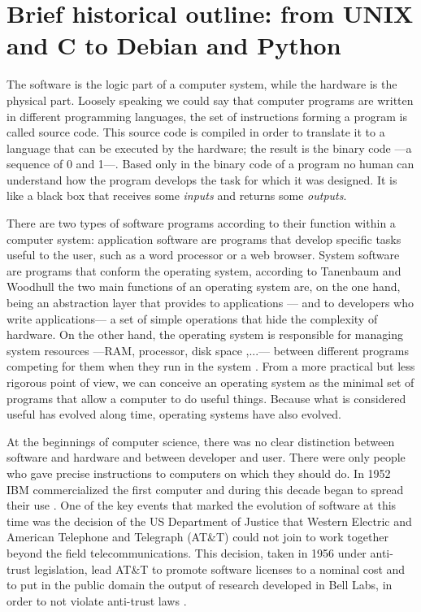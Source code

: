 \chapter{Brief historical outline: from UNIX and C to Debian and Python}
\label{historical_outline}

The software is the logic part of a computer system, while the hardware is the physical part. Loosely speaking we could say that computer programs are written in different programming languages, the set of instructions forming a program is called source code. This source code is compiled in order to translate it to a language that can be executed by the hardware; the result is the binary code ---a sequence of 0 and 1---. Based only in the binary code of a program no human can understand how the program develops the task for which it was designed. It is like a black box that receives some \emph{inputs} and returns some \emph{outputs}.

There are two types of software programs according to their function within a computer system: application software are programs that develop specific tasks useful to the user, such as a word processor or a web browser. System software are programs that conform the operating system, according to Tanenbaum and Woodhull the two main functions of an operating system are, on the one hand, being an abstraction layer that provides to applications --- and to developers who write applications--- a set of simple operations that hide the complexity of hardware. On the other hand, the operating system is responsible for managing system resources ---RAM, processor, disk space ,...--- between different programs competing for them when they run in the system \citep[3-5]{tanenbaum:1996}. From a more practical but less rigorous point of view, we can conceive an operating system as the minimal set of programs that allow a computer to do useful things. Because what is considered useful has evolved along time, operating systems have also evolved.

At the beginnings of computer science, there was no clear distinction between software and hardware and between developer and user. There were only people who gave precise instructions to computers on which they should do. In 1952 IBM commercialized the first computer and during this decade began to spread their use \citep[21]{weber:2004}. One of the key events that marked the evolution of software at this time was the decision of the US Department of Justice that Western Electric and American Telephone and Telegraph (AT\&T) could not join to work together beyond the field telecommunications. This decision, taken in 1956 under anti-trust legislation, lead AT\&T to promote software licenses to a nominal cost and to put in the public domain the output of research developed in Bell Labs, in order to not violate anti-trust laws \citep[20]{roca:2007}.

